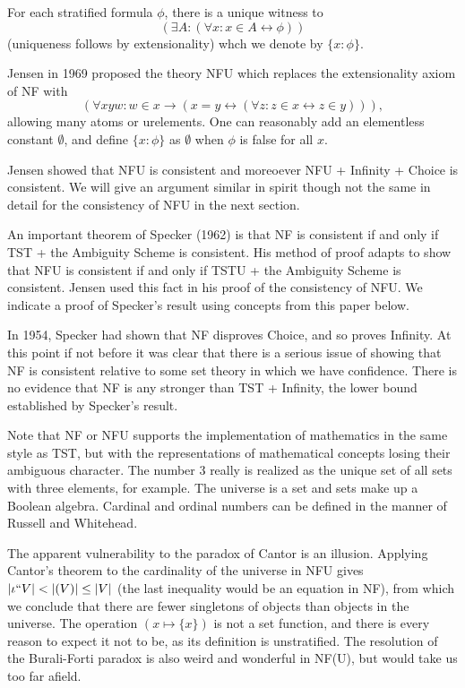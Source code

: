 \documentclass[12pt]{article}
\begin{document}
For each stratified formula $\phi$, there is a unique witness to $$(\exists A:(\forall x:x \in A \leftrightarrow \phi))$$ (uniqueness follows by extensionality) whch we denote by $\{x:\phi\}$.

Jensen in 1969 proposed the theory NFU which replaces the extensionality axiom of NF with $$(\forall xyw:w \in x \rightarrow (x=y \leftrightarrow (\forall z:z \in x \leftrightarrow z\in y))),$$  allowing many atoms or urelements.  One can reasonably add an elementless constant $\emptyset$, and define $\{x:\phi\}$ as $\emptyset$ when $\phi$ is false for all $x$.

Jensen showed that NFU is consistent and moreoever NFU + Infinity + Choice is consistent.  We will give an argument similar in spirit though not the same in detail for the consistency of NFU in the next section.

An important theorem of Specker (1962) is that NF is consistent if and only if TST + the Ambiguity Scheme is consistent.  His method of proof adapts to show that  NFU is consistent if and only if TSTU + the Ambiguity Scheme is consistent.  Jensen used this fact in his proof of the consistency of NFU.  We indicate a proof of Specker's result using concepts from this paper below.

In 1954, Specker had shown that NF disproves Choice, and so proves Infinity.  At this point if not before it was clear that there is a serious issue of showing that NF is consistent relative to some set theory in which we have confidence.  There is no evidence that NF is any stronger than TST + Infinity, the lower bound established by Specker's result.

Note that NF or NFU supports the implementation of mathematics in the same style as TST, but with the representations of mathematical concepts losing their ambiguous character.  The number 3 really is realized as the unique set of all sets with three elements, for example.  The universe is a set and sets make up a Boolean algebra.   Cardinal and ordinal numbers can be defined
in the manner of Russell and Whitehead.

The apparent vulnerability to the paradox of Cantor is an illusion.  Applying Cantor's theorem to the cardinality of the universe in NFU gives $|\iota``V| < |{\cal }(V)| \leq |V|$ (the last inequality would be an equation in NF), from which we conclude that there are fewer singletons of objects than objects in the universe.  The operation $(x \mapsto \{x\})$ is not a set function, and there is every reason to expect it not to be, as its definition is unstratified.  The resolution of the Burali-Forti paradox is also weird and wonderful in NF(U), but would take us too far afield.
\end{document}
